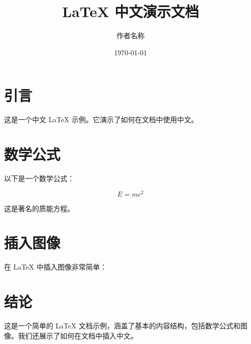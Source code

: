 \documentclass{article}
\title{LaTeX 中文演示文档}
\author{作者名称}
\date{\today}
\begin{document}
\maketitle  %

\section{引言}
这是一个中文 LaTeX 示例。它演示了如何在文档中使用中文。

\section{数学公式}
以下是一个数学公式：

\begin{equation}
    E = mc^2
\end{equation}

这是著名的质能方程。

\section{插入图像}
在 LaTeX 中插入图像非常简单：


\section{结论}
这是一个简单的 LaTeX 文档示例，涵盖了基本的内容结构，包括数学公式和图像。我们还展示了如何在文档中插入中文。
\end{document}
